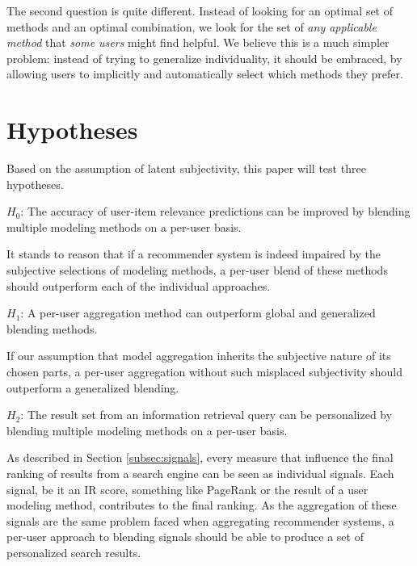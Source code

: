 The second question is quite different. 
Instead of looking for an optimal set of methods and an optimal combination,
we look for the set of \emph{any applicable method} that \emph{some users} might find helpful.
We believe this is a much simpler problem: 
instead of trying to generalize individuality,
it should be embraced, by allowing users to implicitly and automatically select which methods they prefer.


\section{Hypotheses}

Based on the assumption of latent subjectivity, this paper will test three hypotheses.

\begin{blockquote}
  $H_{0}$: The accuracy of user-item relevance predictions can be improved
  by blending multiple modeling methods on a per-user basis.
\end{blockquote}

It stands to reason that if a recommender system is indeed impaired
by the subjective selections of modeling methods,
a per-user blend of these methods should outperform each of the individual approaches.


\begin{blockquote}
$H_{1}$: A per-user aggregation method can outperform global and generalized 
blending methods.
\end{blockquote}

If our assumption that model aggregation inherits the subjective nature of its chosen parts,
a per-user aggregation without such misplaced subjectivity should outperform a
generalized blending.

\begin{blockquote}
$H_{2}$: The result set from an information retrieval query
can be personalized by blending multiple modeling methods on a per-user basis.
\end{blockquote}

As described in Section \ref{subsec:signals},
every measure that influence the final ranking of results from a search engine
can be seen as individual signals. Each signal, be it an IR score,
something like PageRank or the result of a user modeling method,
contributes to the final ranking.
As the aggregation of these signals are the same problem faced
when aggregating recommender systems,
a per-user approach to blending signals should be able to
produce a set of personalized search results.


